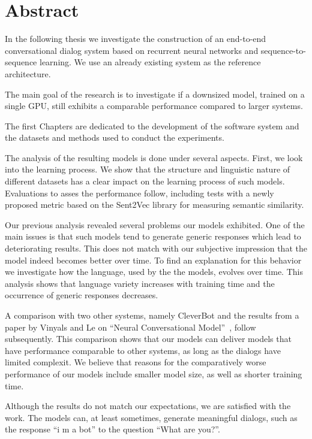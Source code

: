 \chapter*{Abstract}
In the following thesis we investigate the construction of an end-to-end conversational dialog system based on recurrent neural networks and sequence-to-sequence learning. We use an already existing system as the reference architecture. 

The main goal of the research is to investigate if a downsized model, trained on a single GPU, still exhibits a comparable performance compared to larger systems.

The first Chapters are dedicated to the development of the software system and the datasets and methods used to conduct the experiments.

The analysis of the resulting models is done under several aspects. First, we look into the learning process. We show that the structure and linguistic nature of different datasets has a clear impact on the learning process of such models. Evaluations to asses the performance follow, including tests with a newly proposed metric based on the Sent2Vec library for measuring semantic similarity.

Our previous analysis revealed several problems our models exhibited. One of the main issues is that such models tend to generate generic responses which lead to deteriorating results. This does not match with our subjective impression that the model indeed becomes better over time. To find an explanation for this behavior we investigate how the language, used by the the models, evolves over time. This analysis shows that language variety increases with training time and the occurrence of generic responses decreases.

A comparison with two other systems, namely CleverBot and the results from a paper by Vinyals and Le on ``Neural Conversational Model''~\cite{Vinyals:2015}, follow subsequently. This comparison shows that our models can deliver models that have performance comparable to other systems, as long as the dialogs have limited complexit. We believe that reasons for the comparatively worse performance of our models include smaller model size, as well as shorter training time.

Although the results do not match our expectations, we are satisfied with the work. The models can, at least sometimes, generate meaningful dialogs, such as the response ``i m a bot'' to the question ``What are you?''.

